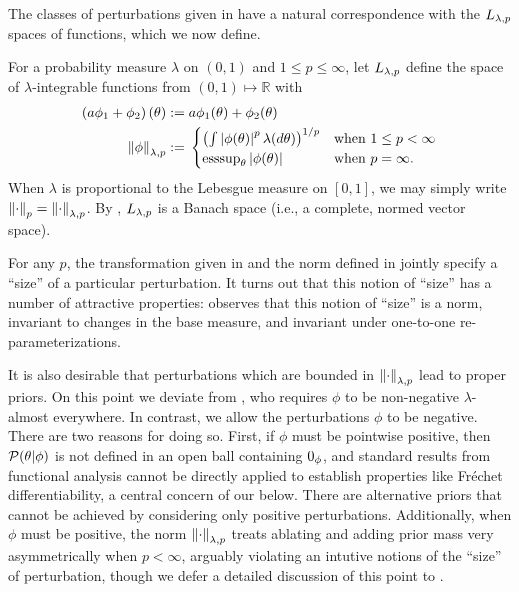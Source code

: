 The classes of perturbations given in  have a natural
correspondence with the ${L_{\lambda, p}}$ spaces of functions, which we now
define.


\begin{defn}
%
For a probability measure $\lambda$ on $(0,1)$ and $1 \le p \le \infty$, let
${L_{\lambda,p}}$ define the space of $\lambda$-integrable functions from
$(0,1)\mapsto\mathbb{R}$ with
%
\begin{align*}
%
\left(a \phi_1 + \phi_2 \right)(\theta) :={}&
    a \phi_1(\theta) + \phi_2(\theta) \\
\norm{\phi}_{\lambda,p} :={}&
\begin{cases}
    \left(\int \abs{\phi(\theta)}^p \lambda(d\theta)\right)^{1/p}
    & \textrm{when }1\le p < \infty\\
    \esssup_{\theta} \abs{\phi(\theta)}
    & \textrm{when }p = \infty.
\end{cases}
%
\end{align*}
%
When $\lambda$ is proportional to the  Lebesgue measure on $[0,1]$, we may
simply write $\left\Vert\cdot\right\Vert_{p} = \left\Vert\cdot\right\Vert_{\lambda,p}$.
%
By \citep[Theorem 5.2.1]{dudley:2018:real}, ${L_{\lambda,p}}$ is a Banach
space (i.e., a complete, normed vector space).
%
\end{defn}


For any $p$, the transformation given in  and the norm
defined in  jointly specify a ``size'' of a particular
perturbation.   It turns out that this notion of ``size'' has a number of
attractive properties: \citep[Result 2]{gustafson:1996:local} observes that this
notion of ``size'' is a norm, invariant to changes in the base measure, and
invariant under one-to-one re-parameterizations.

It is also desirable that perturbations which are bounded in
$\left\Vert\cdot\right\Vert_{\lambda,p}$ lead to proper priors.  On this point we deviate from
\citep{gustafson:1996:local}, who requires $\phi$ to be non-negative
$\lambda$-almost everywhere.  In contrast, we allow the perturbations $\phi$ to
be negative. There are two reasons for doing so.  First, if $\phi$ must be
pointwise positive, then $\mathcal{P}(\theta \vert \phi)$ is not defined in an open ball
containing $0_\phi$, and standard results from functional analysis cannot be
directly applied to establish properties like Fr{\'e}chet differentiability, a
central concern of our  below.  There are alternative
priors that cannot be achieved by considering only positive perturbations.
Additionally, when $\phi$ must be positive, the norm $\left\Vert\cdot\right\Vert_{\lambda, p}$
treats ablating and adding prior mass very asymmetrically when $p < \infty$,
arguably violating an intutive notions of the ``size'' of perturbation, though
we defer a detailed discussion of this point to .

